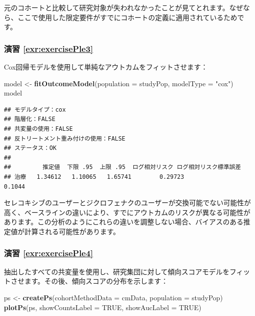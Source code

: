 \documentclass[
  11pt]{book}
\newenvironment{Shaded}{\begin{snugshade}}{\end{snugshade}}
\newcommand{\AttributeTok}[1]{\textcolor[rgb]{0.13,0.29,0.53}{#1}}
\newcommand{\ConstantTok}[1]{\textcolor[rgb]{0.56,0.35,0.01}{#1}}
\newcommand{\FunctionTok}[1]{\textcolor[rgb]{0.13,0.29,0.53}{\textbf{#1}}}
\newcommand{\NormalTok}[1]{#1}
\newcommand{\OtherTok}[1]{\textcolor[rgb]{0.56,0.35,0.01}{#1}}
\newcommand{\StringTok}[1]{\textcolor[rgb]{0.31,0.60,0.02}{#1}}
\theoremstyle{definition}
\theoremstyle{definition}
\theoremstyle{definition}
\theoremstyle{definition}
\theoremstyle{remark}
\begin{document}
元のコホートと比較して研究対象が失われなかったことが見てとれます。なぜなら、ここで使用した限定要件がすでにコホートの定義に適用されているためです。

\subsubsection*{演習 \ref{exr:exercisePle3}}\label{ux6f14ux7fd2-refexrexerciseple3}

Cox回帰モデルを使用して単純なアウトカムをフィットさせます：

\begin{Shaded}
\begin{Highlighting}[]
\NormalTok{model }\OtherTok{\textless{}{-}} \FunctionTok{fitOutcomeModel}\NormalTok{(}\AttributeTok{population =}\NormalTok{ studyPop,}
                         \AttributeTok{modelType =} \StringTok{"cox"}\NormalTok{)}
\NormalTok{model}
\end{Highlighting}
\end{Shaded}

\begin{verbatim}
## モデルタイプ：cox
## 階層化：FALSE
## 共変量の使用：FALSE
## 反トリートメント重み付けの使用：FALSE
## ステータス：OK
## 
##         推定値  下限 .95  上限 .95  ログ相対リスク ログ相対リスク標準誤差
## 治療   1.34612   1.10065   1.65741        0.29723                  0.1044
\end{verbatim}

セレコキシブのユーザーとジクロフェナクのユーザーが交換可能でない可能性が高く、ベースラインの違いにより、すでにアウトカムのリスクが異なる可能性があります。この分析のようにこれらの違いを調整しない場合、バイアスのある推定値が計算される可能性があります。

\subsubsection*{演習 \ref{exr:exercisePle4}}\label{ux6f14ux7fd2-refexrexerciseple4}

抽出したすべての共変量を使用し、研究集団に対して傾向スコアモデルをフィットさせます。その後、傾向スコアの分布を示します：

\begin{Shaded}
\begin{Highlighting}[]
\NormalTok{ps }\OtherTok{\textless{}{-}} \FunctionTok{createPs}\NormalTok{(}\AttributeTok{cohortMethodData =}\NormalTok{ cmData,}
               \AttributeTok{population =}\NormalTok{ studyPop)}
\FunctionTok{plotPs}\NormalTok{(ps, }\AttributeTok{showCountsLabel =} \ConstantTok{TRUE}\NormalTok{, }\AttributeTok{showAucLabel =} \ConstantTok{TRUE}\NormalTok{)}
\end{Highlighting}
\end{Shaded}
\end{document}
